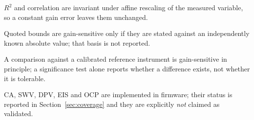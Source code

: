 \begin{table}[!t]
\begin{threeparttable}
\begin{tablenotes}
\item[b] $R^{2}$ and correlation are invariant under affine rescaling of the measured variable, so a constant gain error leaves them unchanged.
\item[c] Quoted bounds are gain-sensitive only if they are stated against an independently known absolute value; that basis is not reported.
\item[d] A comparison against a calibrated reference instrument is gain-sensitive in principle; a significance test alone reports whether a difference exists, not whether it is tolerable.
\item[e] CA, SWV, DPV, EIS and OCP are implemented in firmware; their status is reported in Section~\ref{sec:coverage} and they are explicitly \emph{not} claimed as validated.
\end{tablenotes}
\end{threeparttable}
\end{table}
